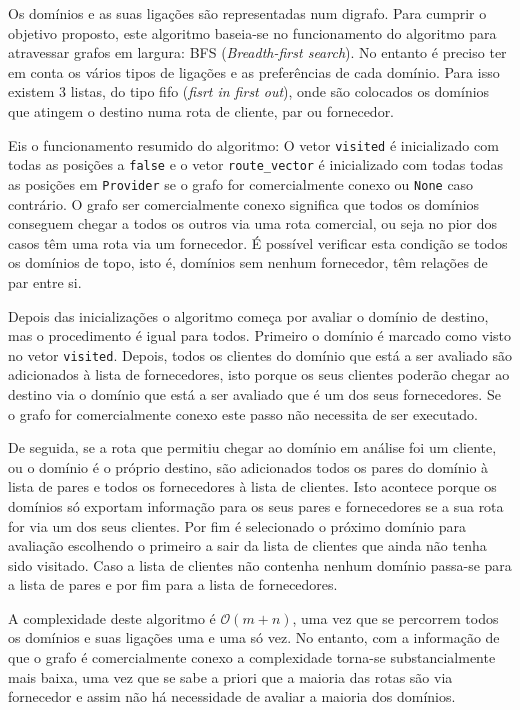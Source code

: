 \documentclass{article}
\begin{document}
Os domínios e as suas ligações são representadas num digrafo. Para cumprir o objetivo proposto, este algoritmo baseia-se no funcionamento do algoritmo para atravessar grafos em largura: BFS (\textit{Breadth-first search}). No entanto é preciso ter em conta os vários tipos de ligações e as preferências de cada domínio. Para isso existem 3 listas, do tipo fifo (\textit{fisrt in first out}), onde são colocados os domínios que atingem o destino numa rota de cliente, par ou fornecedor.

Eis o funcionamento resumido do algoritmo: O vetor \texttt{visited} é inicializado com todas as posições a \texttt{false} e o vetor \texttt{route\_vector} é inicializado com todas todas as posições em \texttt{Provider} se o grafo for comercialmente conexo ou \texttt{None} caso contrário. O grafo ser comercialmente conexo significa que todos os domínios conseguem chegar a todos os outros via uma rota comercial, ou seja no pior dos casos têm uma rota via um fornecedor. É possível verificar esta condição se todos os domínios de topo, isto é, domínios sem nenhum fornecedor, têm relações de par entre si. 

Depois das inicializações o algoritmo começa por avaliar o domínio de destino, mas o procedimento é igual para todos. Primeiro o domínio é marcado como visto no vetor \texttt{visited}. Depois, todos os clientes do domínio que está a ser avaliado são adicionados à lista de fornecedores, isto porque os seus clientes poderão chegar ao destino via o domínio que está a ser avaliado que é um dos seus fornecedores. Se o grafo for comercialmente conexo este passo não necessita de ser executado. 

De seguida, se a rota que permitiu chegar ao domínio em análise foi um cliente, ou o domínio é o próprio destino, são adicionados todos os pares do domínio à lista de pares e todos os fornecedores à lista de clientes. Isto acontece porque os domínios só exportam informação para os seus pares e fornecedores se a sua rota for via um dos seus clientes. Por fim é selecionado o próximo domínio para avaliação escolhendo o primeiro a sair da lista de clientes que ainda não tenha sido visitado. Caso a lista de clientes não contenha nenhum domínio passa-se para a lista de pares e por fim para a lista de fornecedores.

A complexidade deste algoritmo é $\mathcal{O}(m+n)$, uma vez que se percorrem todos os domínios e suas ligações uma e uma só vez. No entanto, com a informação de que o grafo é comercialmente conexo a complexidade torna-se substancialmente mais baixa, uma vez que se sabe a priori que a maioria das rotas são via fornecedor e assim não há necessidade de avaliar a maioria dos domínios.
\end{document}
